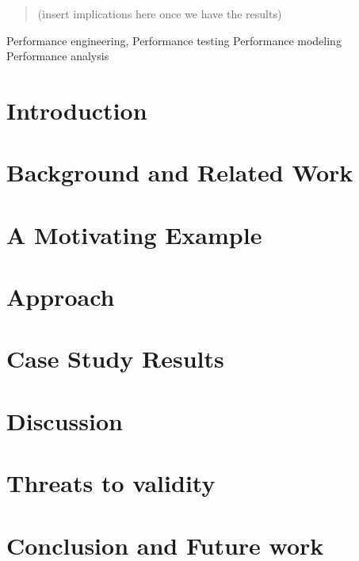 \documentclass[review]{elsarticle}
\begin{document}
\begin{frontmatter}
\begin{abstract}
			(insert implications here once we have the results)
			
		\end{abstract}
		
		\begin{keyword}
			Performance engineering, 
			Performance testing
			Performance modeling
			Performance analysis            
		\end{keyword}
		
	\end{frontmatter}
	
	
	
	 \section{Introduction}
	 \label{sec:introduction}
	 
	
	 \section{Background and Related Work}
	 \label{sec:related_work}
	 
	
	 \section{A Motivating Example}
	 \label{sec:a_motivating_example}
	 
	
	 \section{Approach}
	 \label{sec:approach}
	 
	
	 \section{Case Study Results}
	 \label{sec:results}
	 
	
	 \section{Discussion}
     \label{sec:discussion}
     
     
     	
  	\section{Threats to validity}
   	\label{sec:threats_to_validity}
   	
	
	 \section{Conclusion and Future work}
	 \label{sec:conclusion}
	 
	
	
\end{document}
